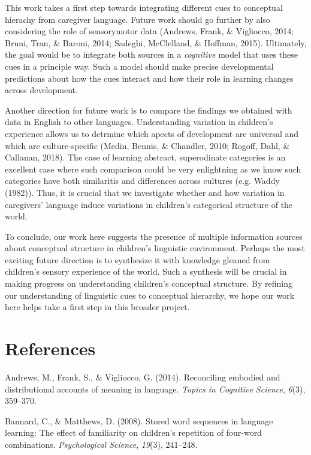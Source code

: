 \documentclass[english,,man,floatsintext]{apa6}
\begin{document}
This work takes a first step towards integrating different cues to conceptual hierachy from caregiver language. Future work should go further by also considering the role of sensorymotor data (Andrews, Frank, \& Vigliocco, 2014; Bruni, Tran, \& Baroni, 2014; Sadeghi, McClelland, \& Hoffman, 2015). Ultimately, the goal would be to integrate both sources in a \emph{cognitive} model that uses these cues in a principle way. Such a model should make precise developmental predictions about how the cues interact and how their role in learning changes across development.

Another direction for future work is to compare the findings we obtained with data in English to other languages. Understanding variation in children's experience allows us to detrmine which apects of development are universal and which are culture-specific (Medin, Bennis, \& Chandler, 2010; Rogoff, Dahl, \& Callanan, 2018). The case of learning abstract, superodinate categories is an excellent case where such comparison could be very enlightning as we know such categories have both similaritis and differences across cultures (e.g. Waddy (1982)). Thus, it is crucial that we investigate whether and how variation in caregivers' language induce variations in children's categorical structure of the world.

To conclude, our work here suggests the presence of multiple information sources about conceptual structure in children's linguistic environment. Perhaps the most exciting future direction is to synthesize it with knowledge gleaned from children's sensory experience of the world. Such a synthesis will be crucial in making progress on understanding children's conceptual structure. By refining our understanding of linguistic cues to conceptual hierarchy, we hope our work here helps take a first step in this broader project.

\hypertarget{references}{%
\section{References}\label{references}}

\setlength{\parindent}{-0.5in}
\setlength{\leftskip}{0.5in}

\hypertarget{refs}{}
\leavevmode\hypertarget{ref-andrews2014}{}%
Andrews, M., Frank, S., \& Vigliocco, G. (2014). Reconciling embodied and distributional accounts of meaning in language. \emph{Topics in Cognitive Science}, \emph{6}(3), 359--370.

\leavevmode\hypertarget{ref-bannard2008}{}%
Bannard, C., \& Matthews, D. (2008). Stored word sequences in language learning: The effect of familiarity on children's repetition of four-word combinations. \emph{Psychological Science}, \emph{19}(3), 241--248.
\end{document}
